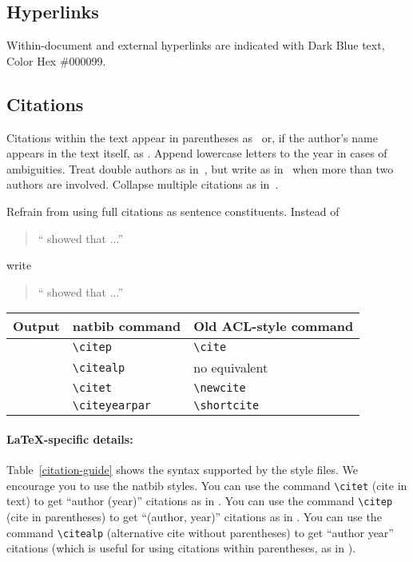 \documentclass[11pt,a4paper]{article}
\begin{document}
\subsection{Hyperlinks}
Within-document and external hyperlinks are indicated with Dark Blue text, Color Hex \#000099.

\subsection{Citations}
Citations within the text appear in parentheses as~\citep{Gusfield:97} or, if the author's name appears in the text itself, as \citet{Gusfield:97}.
Append lowercase letters to the year in cases of ambiguities.  
Treat double authors as in~\citep{Aho:72}, but write as in~\citep{Chandra:81} when more than two authors are involved. Collapse multiple citations as in~\citep{Gusfield:97,Aho:72}. 

Refrain from using full citations as sentence constituents.
Instead of
\begin{quote}
  ``\citep{Gusfield:97} showed that ...''
\end{quote}
write
\begin{quote}
``\citet{Gusfield:97} showed that ...''
\end{quote}

\begin{table*}
\centering
\begin{tabular}{lll}
\hline
\textbf{Output} & \textbf{natbib command} & \textbf{Old ACL-style command}\\
\hline
\citep{Gusfield:97} & \small\verb|\citep| & \small\verb|\cite| \\
\citealp{Gusfield:97} & \small\verb|\citealp| & no equivalent \\
\citet{Gusfield:97} & \small\verb|\citet| & \small\verb|\newcite| \\
\citeyearpar{Gusfield:97} & \small\verb|\citeyearpar| & \small\verb|\shortcite| \\
\hline
\end{tabular}
\caption{\label{citation-guide}
Citation commands supported by the style file.
The style is based on the natbib package and supports all natbib citation commands.
It also supports commands defined in previous ACL style files for compatibility.
}
\end{table*}

\paragraph{\LaTeX-specific details:}
Table~\ref{citation-guide} shows the syntax supported by the style files.
We encourage you to use the natbib styles.
You can use the command {\small\verb|\citet|} (cite in text) to get ``author (year)'' citations as in \citet{Gusfield:97}.
You can use the command {\small\verb|\citep|} (cite in parentheses) to get ``(author, year)'' citations as in \citep{Gusfield:97}.
You can use the command {\small\verb|\citealp|} (alternative cite without  parentheses) to get ``author year'' citations (which is useful for  using citations within parentheses, as in \citealp{Gusfield:97}).
\end{document}
